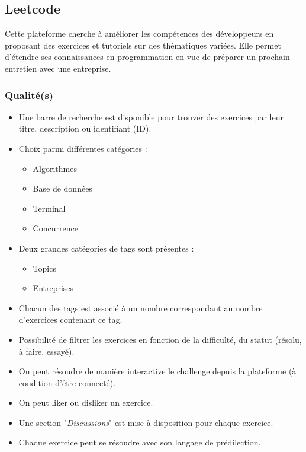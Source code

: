 \subsection*{Leetcode}

Cette plateforme cherche à améliorer les compétences des développeurs en proposant des exercices et tutoriels sur des thématiques variées. Elle permet d'étendre ses connaissances en programmation en vue de préparer un prochain entretien avec une entreprise.

\subsubsection*{Qualité(s)}

\begin{itemize}
    \item Une barre de recherche est disponible pour trouver des exercices par leur titre, description ou identifiant (ID).
    \item Choix parmi différentes catégories :
    \begin{itemize}
        \item Algorithmes
        \item Base de données
        \item Terminal
        \item Concurrence
    \end{itemize}
    \item Deux grandes catégories de \glspl{tag} sont présentes :
    \begin{itemize}
        \item Topics
        \item Entreprises
    \end{itemize}
    \item Chacun des \glspl{tag} est associé à un nombre correspondant au nombre d'exercices contenant ce \gls{tag}.
    \item Possibilité de filtrer les exercices en fonction de la difficulté, du statut (résolu, à faire, essayé).
    \item On peut résoudre de manière interactive le challenge depuis la plateforme (à condition d'être connecté).
    \item On peut liker ou disliker un exercice.
    \item Une section "\textit{Discussions}" est mise à disposition pour chaque exercice.
    \item Chaque exercice peut se résoudre avec son langage de prédilection.
\end{itemize}

